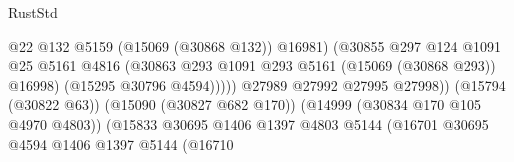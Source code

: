 \begin{lexlean}{RustStd}
\begin{coremodule}
                                                            @22
                                                            @132
                                                            @5159
                                                            (@15069 (@30868 @132))
                                                            @16981)
                                                          (@30855
                                                            @297
                                                            @124
                                                            @1091
                                                            @25
                                                            @5161
                                                            @4816
                                                            (@30863
                                                              @293
                                                              @1091
                                                              @293
                                                              @5161
                                                              (@15069 (@30868 @293))
                                                              @16998)
                                                            (@15295 @30796 @4594)))))
                                                    @27989
                                                    @27992
                                                    @27995
                                                    @27998))
                                                (@15794 (@30822 @63))
                                                (@15090 (@30827 @682 @170))
                                                (@14999 (@30834 @170 @105 @4970 @4803))
                                                (@15833
                                                  @30695
                                                  @1406
                                                  @1397
                                                  @4803
                                                  @5144
                                                  (@16701
                                                    @30695
                                                    @4594
                                                    @1406
                                                    @1397
                                                    @5144
                                                    (@16710

\end{coremodule}
\end{lexlean}
